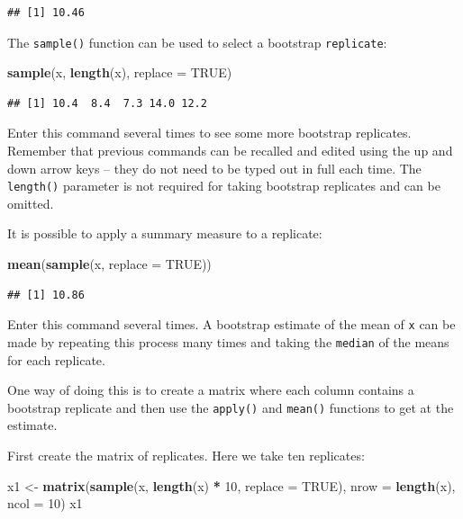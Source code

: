 \documentclass[12pt,a4paper]{book}
\newenvironment{Shaded}{\begin{snugshade}}{\end{snugshade}}
\newcommand{\DataTypeTok}[1]{\textcolor[rgb]{0.13,0.29,0.53}{#1}}
\newcommand{\DecValTok}[1]{\textcolor[rgb]{0.00,0.00,0.81}{#1}}
\newcommand{\KeywordTok}[1]{\textcolor[rgb]{0.13,0.29,0.53}{\textbf{#1}}}
\newcommand{\NormalTok}[1]{#1}
\newcommand{\OperatorTok}[1]{\textcolor[rgb]{0.81,0.36,0.00}{\textbf{#1}}}
\newcommand{\OtherTok}[1]{\textcolor[rgb]{0.56,0.35,0.01}{#1}}
\newcommand{\StringTok}[1]{\textcolor[rgb]{0.31,0.60,0.02}{#1}}
\theoremstyle{definition}
\theoremstyle{definition}
\theoremstyle{definition}
\theoremstyle{remark}
\begin{document}
\begin{verbatim}
## [1] 10.46
\end{verbatim}

The \texttt{sample()} function can be used to select a bootstrap
\texttt{replicate}:

\begin{Shaded}
\begin{Highlighting}[]
\KeywordTok{sample}\NormalTok{(x, }\KeywordTok{length}\NormalTok{(x), }\DataTypeTok{replace =} \OtherTok{TRUE}\NormalTok{)}
\end{Highlighting}
\end{Shaded}

\begin{verbatim}
## [1] 10.4  8.4  7.3 14.0 12.2
\end{verbatim}

Enter this command several times to see some more bootstrap replicates.
Remember that previous commands can be recalled and edited using the up
and down arrow keys -- they do not need to be typed out in full each
time. The \texttt{length()} parameter is not required for taking
bootstrap replicates and can be omitted.

It is possible to apply a summary measure to a replicate:

\begin{Shaded}
\begin{Highlighting}[]
\KeywordTok{mean}\NormalTok{(}\KeywordTok{sample}\NormalTok{(x, }\DataTypeTok{replace =} \OtherTok{TRUE}\NormalTok{))}
\end{Highlighting}
\end{Shaded}

\begin{verbatim}
## [1] 10.86
\end{verbatim}

Enter this command several times. A bootstrap estimate of the mean of
\texttt{x} can be made by repeating this process many times and taking
the \texttt{median} of the means for each replicate.

One way of doing this is to create a matrix where each column contains a
bootstrap replicate and then use the \texttt{apply()} and
\texttt{mean()} functions to get at the estimate.

First create the matrix of replicates. Here we take ten replicates:

\begin{Shaded}
\begin{Highlighting}[]
\NormalTok{x1 <-}\StringTok{ }\KeywordTok{matrix}\NormalTok{(}\KeywordTok{sample}\NormalTok{(x, }\KeywordTok{length}\NormalTok{(x) }\OperatorTok{*}\StringTok{ }\DecValTok{10}\NormalTok{, }\DataTypeTok{replace =} \OtherTok{TRUE}\NormalTok{),}
             \DataTypeTok{nrow =} \KeywordTok{length}\NormalTok{(x), }\DataTypeTok{ncol =} \DecValTok{10}\NormalTok{)}
\NormalTok{x1}
\end{Highlighting}
\end{Shaded}
\end{document}

